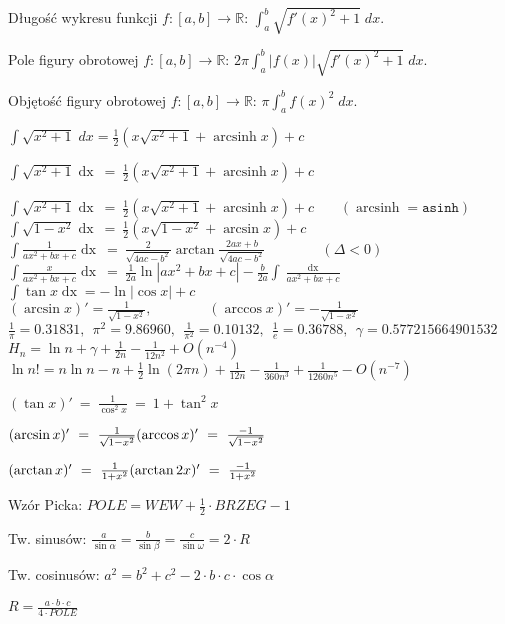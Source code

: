 
\usepackage[utf8]{inputenc}
\usepackage{polski}
\usepackage{amsfonts}
\usepackage{amsmath}
\DeclareMathOperator{\arcsinh}{arcsinh}
\DeclareMathOperator{\dx}{ dx}


Długość wykresu funkcji $f : [a, b] \to \mathbb{R}$:
  \hfill
  $\int_a^b \sqrt{f'(x)^2 + 1} \; dx$.

Pole figury obrotowej $f : [a, b] \to \mathbb{R}$:
  \hfill
  $2 \pi \int_a^b |f(x)| \sqrt{f'(x)^2 + 1} \; dx$.

Objętość figury obrotowej $f : [a, b] \to \mathbb{R}$:
  \hfill
  $\pi \int_a^b f(x)^2 \; dx$.

$\int \sqrt{x^2 + 1} \; dx = \frac12 \left( x\sqrt{x^2 + 1} + \arcsinh x  \right) + c$

$\int \sqrt{x^2 + 1} \dx\ =\ \frac12 \left( x\sqrt{x^2 + 1} + \arcsinh x \right) + c$

 \( \int \sqrt{x^2 + 1} \dx\ =\ \frac12 \left( x\sqrt{x^2 + 1} + \arcsinh x \right) + c\) 
  \ \ \ $(\arcsinh = \mathtt{asinh})$ \\
  \( \int \sqrt{1 - x^2} \dx\ =\ \frac12 \left( x\sqrt{1 - x^2} + \arcsin x \right) + c\) \\
  \( \int \frac{1}{ax^2 + bx + c} \dx\ =\ \frac{2}{\sqrt{4ac - b^2}} \arctan
      \frac{2ax + b}{\sqrt{4ac - b^2}} \qquad \qquad (\Delta < 0)\) \\
  \( \int \frac{x}{ax^2 + bx + c} \dx\ =\ \frac{1}{2a} \ln |ax^2 + bx + c|
      - \frac{b}{2a} \int \frac{\dx}{ax^2 + bx + c} \) \\
  \( \int \tan x \dx = - \ln |\cos x| + c \) \\
  \( (\arcsin x)' = \frac{1}{\sqrt{1 - x^2}}, \qquad \qquad
     (\arccos x)' = -\frac{1}{\sqrt{1 - x^2}} \) \\
  \( \frac1{\pi} = 0.31831,\ \ \pi^2 = 9.86960,\ \ \frac1{\pi^2} = 0.10132,\ \ \frac1e = 0.36788,
  \ \ \gamma = 0.577215664901532\) \\
  \( H_n = \ln n + \gamma + \frac1{2n} - \frac1{12n^2} + O(n^{-4}) \) \\
  \( \ln n! = n \ln n - n + \frac12 \ln(2 \pi n) + \frac1{12n} - \frac1{360n^3} + \frac1{1260n^5}
  - O(n^{-7}) \)

$(\tan x)'\ =\ \frac{1}{\cos^2 x}\ =\ 1 + \tan^2 x$

$(\arcsin x)'\ =\ \frac{1}{\sqrt{1-x^2}} \hfill
	(\arccos x)'\ =\ \frac{-1}{\sqrt{1-x^2}}$

$(\arctan x)'\ =\ \frac{1}{1+x^2} \hfill
	(\arctan2 x)'\ =\ \frac{-1}{1+x^2}$

Wzór Picka:
  \hfill
  $POLE = WEW + \frac{1}{2} \cdot BRZEG  - 1$

Tw. sinusów:
  \hfill
  $\frac{a}{\sin \alpha} = \frac{b}{\sin \beta} = \frac{c}{\sin \omega} = 2 \cdot R$

Tw. cosinusów:
  \hfill
  $a^2 = b^2 + c^2 - 2 \cdot b \cdot c \cdot \cos \alpha$

$R = \frac{a \cdot b \cdot c}{4 \cdot POLE}$

